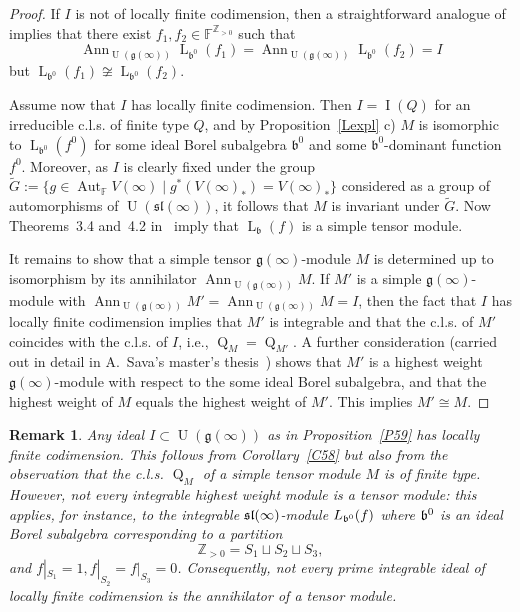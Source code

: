 \documentclass{emsprocart}
\newtheorem{remark}[theorem]{Remark}
\begin{document}
\begin{proof} If $I$ is not of locally finite codimension, then a straightforward analogue of~\cite[Lemma~6.8]{PP2} implies that there exist $f_1, f_2\in \mathbb F^{\mathbb Z_{>0}}$ such that $$\operatorname{Ann}_{\operatorname{U}(\mathfrak g(\infty))} \operatorname{L}_{\mathfrak b^0}(f_1)=\operatorname{Ann}_{\operatorname{U}(\mathfrak g(\infty))} \operatorname{L}_{\mathfrak b^0}(f_2)=I$$but $\operatorname{L}_{\mathfrak b^0}(f_1)\not\cong \operatorname{L}_{\mathfrak b^0}(f_2)$.

Assume now that $I$ has locally finite codimension. Then $I=\operatorname{I}(Q)$ for an irreducible c.l.s. of finite type $Q$, and by Proposition~\ref{Lexpl} c) $M$ is isomorphic to $\operatorname{L}_{\mathfrak b^0}(f^0)$ for some ideal Borel subalgebra $\mathfrak b^0$ and some $\mathfrak b^0$-dominant function $f^0$. Moreover, as $I$ is clearly fixed under the group $\tilde G:= \{g\in\operatorname{Aut}_\mathbb FV(\infty)\mid g^*(V(\infty)_*)=V(\infty)_*\}$ considered as a group of automorphisms of $\operatorname{U}(\mathfrak{sl}(\infty))$, it follows that $M$ is invariant under $\tilde G$. Now Theorems~3.4 and~4.2 in~\cite{DPS} imply that $\operatorname{L}_\mathfrak b(f)$ is a simple tensor module.

It remains to show that a simple tensor $\mathfrak g(\infty)$-module $M$ is determined up to isomorphism by its annihilator $\operatorname{Ann}_{\operatorname{U}(\mathfrak g(\infty))}M$. If $M'$ is a simple $\mathfrak g(\infty)$-module with $\operatorname{Ann}_{\operatorname{U}(\mathfrak g(\infty))}M'=\operatorname{Ann}_{\operatorname{U}(\mathfrak g(\infty))} M=I$, then the fact that $I$ has locally finite codimension implies that $M'$ is integrable and that the c.l.s. of $M'$ coincides with the c.l.s. of $I$, i.e., $\operatorname{Q}_M=\operatorname{Q}_{M'}$. A further consideration  (carried out in detail in A.~Sava's master's thesis~\cite{Sa}) shows that $M'$ is a highest weight $\mathfrak g(\infty)$-module with respect to the some ideal Borel subalgebra, and that the highest weight of $M$ equals the highest weight of $M'$. This implies $M'\cong M$.\end{proof}
\begin{remark} Any ideal $I\subset\operatorname{U}(\mathfrak g(\infty))$ as in Proposition~\ref{P59} has locally finite codimension. This follows from Corollary~\ref{C58} but also from the observation that the c.l.s. $\operatorname{Q}_M$ of a simple tensor module $M$ is of finite type. However, not every integrable highest weight module is a tensor module: this applies, for instance, to the integrable $\frak{sl}(\infty)$-module $L_{\frak b^0}(f)$ where $\frak b^0$ is an ideal Borel subalgebra corresponding to a partition $$\mathbb Z_{>0}=S_1\sqcup S_2\sqcup S_3,$$ and $f|_{S_1}=1, f|_{S_2}=f|_{S_3}=0$. Consequently, not every prime integrable ideal of locally finite codimension is the annihilator of a 
tensor module.\end{remark}
\end{document}

